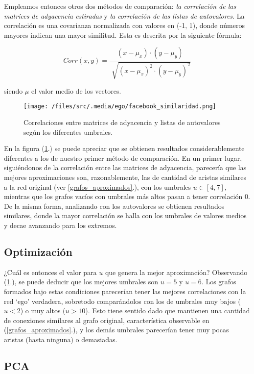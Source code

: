 \vspace{1em}

Empleamos entonces otros dos métodos de comparación: \textit{la correlación de las matrices de adyacencia estiradas} y \textit{la correlación de las listas de autovalores}. La correlación es una covarianza normalizada con valores en (-1, 1), donde números mayores indican una mayor similitud. Esta es descrita por la siguiente fórmula:

\begin{equation}
    Corr(x, y) = \frac{(x - \mu_{x}) \cdot (y - \mu_{y})}{\sqrt[]{(x - \mu_{x})^{2} \cdot (y - \mu_{y})^{2}}}
\end{equation}

siendo $\mu$ el valor medio de los vectores.

\vspace{1em}
\begin{figure}[!htbp]
\centering
\texttt{[image: /files/src/.media/ego/facebook\_similaridad.png]}
\caption{Correlaciones entre matrices de adyacencia y listas de autovalores según los diferentes umbrales.}
\label{grafo_correlaciones}
\end{figure}

En la figura (\ref{grafo_correlaciones}.) se puede apreciar que se obtienen resultados considerablemente diferentes a los de nuestro primer método de comparación. En un primer lugar, siguiéndonos de la correlación entre las matrices de adyacencia, parecería que las mejores aproximaciones son, razonablemente, las de cantidad de aristas similares a la red original (ver \ref{grafos_aproximados}.), con los umbrales $u \in [4,7]$, mientras que los grafos vacíos con umbrales más altos pasan a tener correlación 0. De la misma forma, analizando con los autovalores se obtienen resultados similares, donde la mayor correlación se halla con los umbrales de valores medios y decae avanzando para los extremos.  



\vspace{2em}
\subsection{Optimización}

¿Cuál es entonces el valor para $u$ que genera la mejor aproximación? 
Observando (\ref{grafo_correlaciones}.), se puede deducir que los mejores umbrales son $u = 5$ y $u = 6$. Los grafos formados bajo estas condiciones parecerían tener las mejores correlaciones con la red `ego' verdadera, sobretodo comparándolos con los de umbrales muy bajos ($u < 2$) o muy altos ($u > 10$). Esto tiene sentido dado que mantienen una cantidad de conexiones similares al grafo original, característica observable en (\ref{grafos_aproximados}.), y los demás umbrales parecerían tener muy pocas aristas (hasta ninguna) o demasiadas.



\vspace{2em}
\subsection{PCA}
